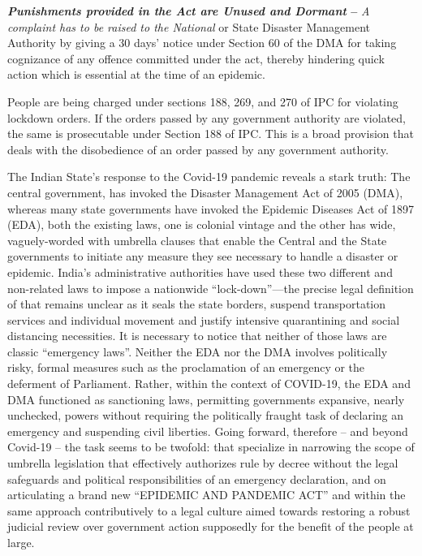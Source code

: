 \begin{multicols}{2}
\noi
\textbf{\textit{Punishments provided in the Act are Unused and Dormant} –} \textit{A complaint has to be raised to the National} or State Disaster Management Authority by giving a 30 days’ notice under
Section 60 of the DMA for taking cognizance of any offence committed under the act,
thereby hindering quick action which is essential at the time of an epidemic.


\noi
People are being charged under sections 188, 269, and 270 of IPC for violating lockdown
orders. If the orders passed by any government authority are violated, the same is
prosecutable under Section 188 of IPC. This is a broad provision that deals with the
disobedience of an order passed by any government authority.

\vspace{-.1cm}


\vspace{-.1cm}

\noi
The Indian State’s response to the Covid-19 pandemic reveals a stark truth: The central
government, has invoked the Disaster Management Act of 2005 (DMA), whereas many state
governments have invoked the Epidemic Diseases Act of 1897 (EDA), both the existing laws,
one is colonial vintage and the other has wide, vaguely-worded with umbrella clauses that
enable the Central and the State governments to initiate any measure they see necessary to
handle a disaster or epidemic. India’s administrative authorities have used these two different 
and non-related laws to impose a nationwide “lock-down”—the precise legal definition of
that remains unclear as it seals the state borders, suspend transportation services and
individual movement and justify intensive quarantining and social distancing necessities.
It is necessary to notice that neither of those laws are classic “emergency laws”. Neither the
EDA nor the DMA involves politically risky, formal measures such as the proclamation of an
emergency or the deferment of Parliament. Rather, within the context of COVID-19, the
EDA and DMA functioned as sanctioning laws, permitting governments expansive, nearly
unchecked, powers without requiring the politically fraught task of declaring an emergency
and suspending civil liberties. Going forward, therefore – and beyond Covid-19 – the task
seems to be twofold: that specialize in narrowing the scope of umbrella legislation that
effectively authorizes rule by decree without the legal safeguards and political responsibilities
of an emergency declaration, and on articulating a brand new “EPIDEMIC AND
PANDEMIC ACT” and within the same approach contributively to a legal culture aimed
towards restoring a robust judicial review over government action supposedly for the benefit
of the people at large.


\end{multicols}
